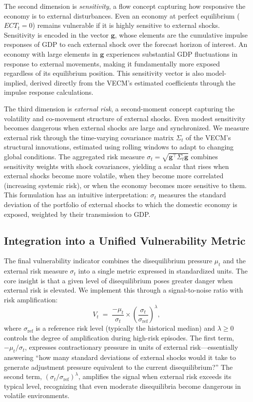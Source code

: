 \documentclass[12pt,a4paper]{article}
\numberwithin{equation}{section}
\theoremstyle{definition}
\theoremstyle{remark}
\newcommand{\vect}[1]{\boldsymbol{#1}}
\begin{document}
The second dimension is \textit{sensitivity}, a flow concept capturing how responsive the economy is to external disturbances. Even an economy at perfect equilibrium ($ECT_t = 0$) remains vulnerable if it is highly sensitive to external shocks. Sensitivity is encoded in the vector $\vect{g}$, whose elements are the cumulative impulse responses of GDP to each external shock over the forecast horizon of interest. An economy with large elements in $\vect{g}$ experiences substantial GDP fluctuations in response to external movements, making it fundamentally more exposed regardless of its equilibrium position. This sensitivity vector is also model-implied, derived directly from the VECM's estimated coefficients through the impulse response calculations.

The third dimension is \textit{external risk}, a second-moment concept capturing the volatility and co-movement structure of external shocks. Even modest sensitivity becomes dangerous when external shocks are large and synchronized. We measure external risk through the time-varying covariance matrix $\Sigma_t$ of the VECM's structural innovations, estimated using rolling windows to adapt to changing global conditions. The aggregated risk measure $\sigma_t = \sqrt{\vect{g}^\top \Sigma_t \vect{g}}$ combines sensitivity weights with shock covariances, yielding a scalar that rises when external shocks become more volatile, when they become more correlated (increasing systemic risk), or when the economy becomes more sensitive to them. This formulation has an intuitive interpretation: $\sigma_t$ measures the standard deviation of the portfolio of external shocks to which the domestic economy is exposed, weighted by their transmission to GDP.


\subsection{Integration into a Unified Vulnerability Metric}

The final vulnerability indicator combines the disequilibrium pressure $\mu_t$ and the external risk measure $\sigma_t$ into a single metric expressed in standardized units. The core insight is that a given level of disequilibrium poses greater danger when external risk is elevated. We implement this through a signal-to-noise ratio with risk amplification:
\begin{equation}
\label{eq:vulnerability_indicator}
V_t \;=\; \frac{-\mu_t}{\sigma_t} \times \left(\frac{\sigma_t}{\sigma_{\text{ref}}}\right)^\lambda,
\end{equation}
where $\sigma_{\text{ref}}$ is a reference risk level (typically the historical median) and $\lambda \geq 0$ controls the degree of amplification during high-risk episodes. The first term, $-\mu_t/\sigma_t$, expresses contractionary pressure in units of external risk---essentially answering ``how many standard deviations of external shocks would it take to generate adjustment pressure equivalent to the current disequilibrium?'' The second term, $(\sigma_t/\sigma_{\text{ref}})^\lambda$, amplifies the signal when external risk exceeds its typical level, recognizing that even moderate disequilibria become dangerous in volatile environments.
\end{document}
